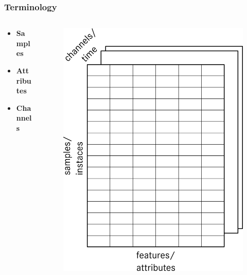 \documentclass[aspectratio=169]{beamer}
\begin{document}
\begin{frame}
    \frametitle{Terminology}
    \begin{columns}
        \begin{column}{0.48\textwidth}
            \begin{itemize}
                \item \textbf{Samples}
                \item \textbf{Attributes}
                \item \textbf{Channels}
            \end{itemize}
        \end{column}
        \begin{column}{0.48\textwidth}
            \begin{figure}
                \includegraphics{terminology.png}
            \end{figure}
        \end{column}
    \end{columns}
\end{frame}
\end{document}
